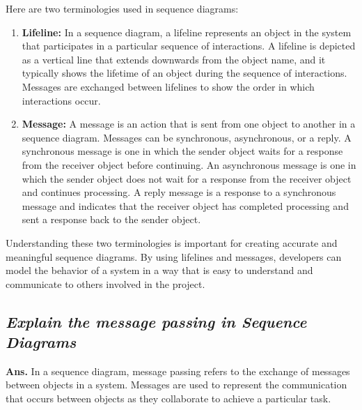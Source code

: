 \documentclass{article}
\begin{document}
Here are two terminologies used in sequence diagrams:
\begin{enumerate}
	\item \textbf{Lifeline:} In a sequence diagram, a lifeline represents an object in the system that participates in a particular sequence of interactions. A lifeline is depicted as a vertical line that extends downwards from the object name, and it typically shows the lifetime of an object during the sequence of interactions. Messages are exchanged between lifelines to show the order in which interactions occur.
	\item \textbf{Message:} A message is an action that is sent from one object to another in a sequence diagram. Messages can be synchronous, asynchronous, or a reply. A synchronous message is one in which the sender object waits for a response from the receiver object before continuing. An asynchronous message is one in which the sender object does not wait for a response from the receiver object and continues processing. A reply message is a response to a synchronous message and indicates that the receiver object has completed processing and sent a response back to the sender object.

\end{enumerate}
Understanding these two terminologies is important for creating accurate and meaningful sequence diagrams. By using lifelines and messages, developers can model the behavior of a system in a way that is easy to understand and communicate to others involved in the project.
\subsection{\textit{Explain the message passing in Sequence Diagrams}}
\textbf{Ans.} In a sequence diagram, message passing refers to the exchange of messages between objects in a system. Messages are used to represent the communication that occurs between objects as they collaborate to achieve a particular task.\\
\end{document}
